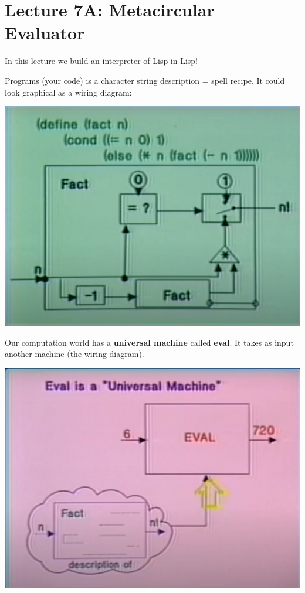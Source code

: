 \documentclass[a4paper,twoside]{article}
\numberwithin{equation}{section}
\begin{document}
\section{Lecture 7A: Metacircular Evaluator}
In this lecture we build an interpreter of Lisp in Lisp!

Programs (your code) is a character string description = spell recipe.
It could look graphical as a wiring diagram:
\begin{center}
    \includegraphics[scale=0.3]{assets/program_diagram.png}
\end{center}

Our computation world has a \textbf{universal machine} called \textbf{eval}.
It takes as input another machine (the wiring diagram).
\begin{center}
    \includegraphics[scale=0.3]{assets/universal machine.png}
\end{center}
\end{document}
